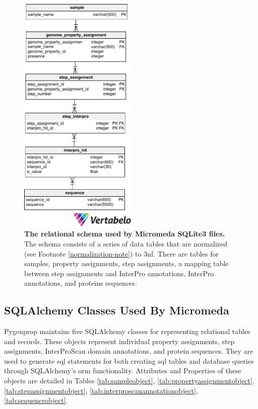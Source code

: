 \begin{figure}[!ht]
  \centering
	\includegraphics[width=0.50\textwidth]{media/micromeda_schema.pdf}
	 \caption[The relational schema used by Micromeda SQLite3 files.]{\textbf{The 
relational schema used by Micromeda SQLite3 files.} The schema consists of a 
series of data tables that are normalized (see Footnote 
\ref{normalization-note}) to \gls{3nf}. There are tables for samples, property 
assignments, step assignments, a mapping table between step assignments and 
InterPro annotations, InterPro annotations, and proteins sequences.}
	 \label{fig:micromedaschema}
\end{figure}

\subsection{SQLAlchemy Classes Used By Micromeda} \label{sqlalchemy-classes}

Pygenprop maintains five SQLAlchemy classes for representing relational tables 
and records. These objects represent individual property assignments, step 
assignments, InterProScan domain annotations, and protein sequences. They are 
used to generate \gls{sql} statements for both creating \gls{sql} tables and 
database queries through SQLAlchemy's \gls{orm} functionality. Attributes and 
Properties of these objects are detailed in Tables \ref{tab:sampleobject}, 
\ref{tab:propertyassignmentobject}, \ref{tab:stepassignmentobject}, 
\ref{tab:interproscanannotationobject}, \ref{tab:sequenceobject}.

